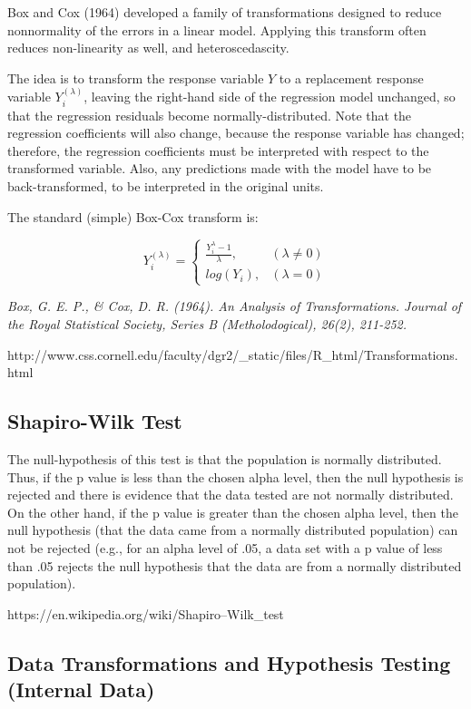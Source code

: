 \documentclass[
  letterpaper,
  DIV=11,
  numbers=noendperiod]{scrartcl}
\begin{document}
Box and Cox (1964) developed a family of transformations designed to
reduce nonnormality of the errors in a linear model. Applying this
transform often reduces non-linearity as well, and heteroscedascity.

The idea is to transform the response variable \(Y\) to a replacement
response variable \(Y_i^{(\lambda)}\), leaving the right-hand side of
the regression model unchanged, so that the regression residuals become
normally-distributed. Note that the regression coefficients will also
change, because the response variable has changed; therefore, the
regression coefficients must be interpreted with respect to the
transformed variable. Also, any predictions made with the model have to
be back-transformed, to be interpreted in the original units.

The standard (simple) Box-Cox transform is:

\[
    Y_i^{(\lambda)}=
\begin{cases}
{\frac {Y_i^\lambda - 1} \lambda},  & {(\lambda \neq 0)} \\
log(Y_i), & {(\lambda = 0)}
\end{cases}
\]

\emph{Box, G. E. P., \& Cox, D. R. (1964). An Analysis of
Transformations. Journal of the Royal Statistical Society, Series B
(Metholodogical), 26(2), 211-252.}

http://www.css.cornell.edu/faculty/dgr2/\_static/files/R\_html/Transformations.html

\hypertarget{shapiro-wilk-test}{%
\subsection{Shapiro-Wilk Test}\label{shapiro-wilk-test}}

The null-hypothesis of this test is that the population is normally
distributed. Thus, if the p value is less than the chosen alpha level,
then the null hypothesis is rejected and there is evidence that the data
tested are not normally distributed. On the other hand, if the p value
is greater than the chosen alpha level, then the null hypothesis (that
the data came from a normally distributed population) can not be
rejected (e.g., for an alpha level of .05, a data set with a p value of
less than .05 rejects the null hypothesis that the data are from a
normally distributed population).

https://en.wikipedia.org/wiki/Shapiro--Wilk\_test

\hypertarget{data-transformations-and-hypothesis-testing-internal-data}{%
\subsection{Data Transformations and Hypothesis Testing (Internal
Data)}\label{data-transformations-and-hypothesis-testing-internal-data}}
\end{document}

